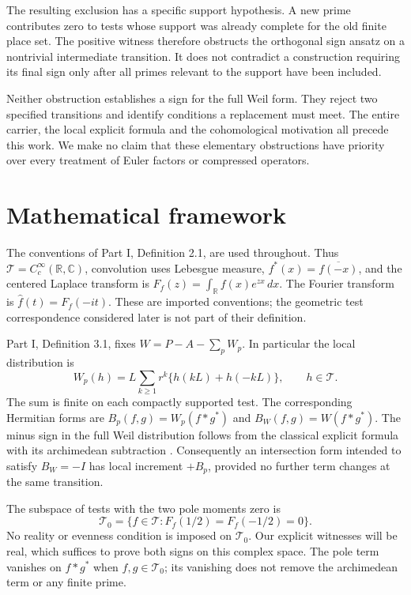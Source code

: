 \documentclass[11pt,letterpaper]{article}
\theoremstyle{definition}
\theoremstyle{remark}
\newcommand{\R}{\mathbb R}
\newcommand{\C}{\mathbb C}
\newcommand{\T}{\mathcal T}
\begin{document}
The resulting exclusion has a specific support hypothesis. A new prime
contributes zero to tests whose support was already complete for the
old finite place set. The positive witness therefore obstructs the
orthogonal sign ansatz on a nontrivial intermediate transition. It
does not contradict a construction requiring its final sign only
after all primes relevant to the support have been included.

Neither obstruction establishes a sign for the full Weil form. They
reject two specified transitions and identify conditions a replacement
must meet. The entire carrier, the local explicit formula and the
cohomological motivation all precede this work. We make no claim that
these elementary obstructions have priority over every treatment of
Euler factors or compressed operators.

\section{Mathematical framework}
\label{sec:framework}

The conventions of Part I, Definition 2.1, are used throughout.
Thus $\T=C_c^\infty(\R,\C)$, convolution uses Lebesgue measure,
$f^*(x)=\overline{f(-x)}$, and the centered Laplace transform is
$F_f(z)=\int_\R f(x)e^{zx}\,dx$. The Fourier transform is
$\widehat f(t)=F_f(-it)$. These are imported conventions; the
geometric test correspondence considered later is not part of their
definition.

Part I, Definition 3.1, fixes
$W=P-A-\sum_pW_p$. In particular the local distribution is
\begin{equation}
 W_p(h)=L\sum_{k\geq1}r^k\{h(kL)+h(-kL)\},
 \qquad h\in\T.
 \label{eq:local-Weil}
\end{equation}
The sum is finite on each compactly supported test. The corresponding
Hermitian forms are $B_p(f,g)=W_p(f*g^*)$ and $B_W(f,g)=W(f*g^*)$.
The minus sign in the full
Weil distribution follows from the classical explicit formula with
its archimedean subtraction \cite[Appendix B]{CC20}. Consequently an
intersection form intended to satisfy $B_W=-I$ has local increment
$+B_p$, provided no further term changes at the same transition.

The subspace of tests with the two pole moments zero is
\begin{equation}
 \T_0=\{f\in\T:F_f(1/2)=F_f(-1/2)=0\}.
 \label{eq:pole-tests}
\end{equation}
No reality or evenness condition is imposed on $\T_0$. Our explicit
witnesses will be real, which suffices to prove both signs on this
complex space. The pole term vanishes on $f*g^*$ when $f,g\in\T_0$;
its vanishing does not remove the archimedean term or any finite prime.
\end{document}
